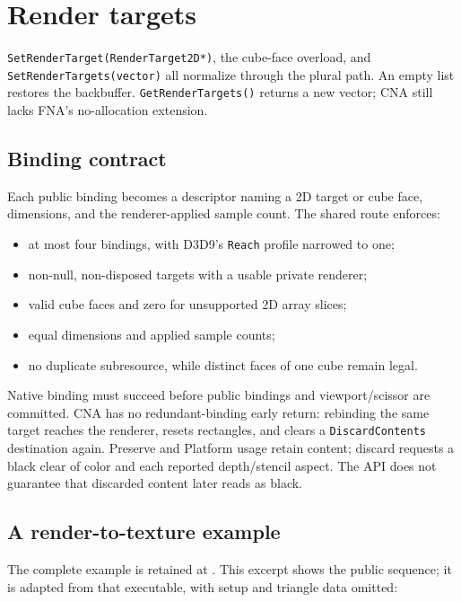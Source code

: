 \section{Render targets}
\label{sec:render-targets}

\texttt{SetRenderTarget(RenderTarget2D*)}, the cube-face overload, and
\texttt{SetRenderTargets(vector)} all normalize through the plural path. An empty list restores
the backbuffer. \texttt{GetRenderTargets()} returns a new vector; CNA still lacks FNA's
no-allocation extension.

\subsection{Binding contract}
\label{sec:graphicsdevice-target-binding-contract}

Each public binding becomes a descriptor naming a 2D target or cube face, dimensions, and the
renderer-applied sample count. The shared route enforces:

\begin{itemize}
  \item at most four bindings, with D3D9's \texttt{Reach} profile narrowed to one;
  \item non-null, non-disposed targets with a usable private renderer;
  \item valid cube faces and zero for unsupported 2D array slices;
  \item equal dimensions and applied sample counts;
  \item no duplicate subresource, while distinct faces of one cube remain legal.
\end{itemize}

Native binding must succeed before public bindings and viewport/scissor are committed. CNA has no
redundant-binding early return: rebinding the same target reaches the renderer, resets rectangles,
and clears a \texttt{DiscardContents} destination again. Preserve and Platform usage retain
content; discard requests a black clear of color and each reported depth/stencil aspect. The API
does not guarantee that discarded content later reads as black.

\subsection{A render-to-texture example}
\label{sec:worked-rendertarget}

The complete example is retained at
. This excerpt shows the public
sequence; it is adapted from that executable, with setup and triangle data omitted:

